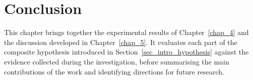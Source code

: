 
\chapter{Conclusion}
\label{chap_6}

This chapter brings together the experimental results of
Chapter~\ref{chap_4} and the discussion developed in Chapter~\ref{chap_5}.
It evaluates each part of the composite hypothesis introduced in
Section~\ref{sec_intro_hypothesis} against the evidence collected during
the investigation,
before summarising the main contributions of the work and identifying
directions for future research.






